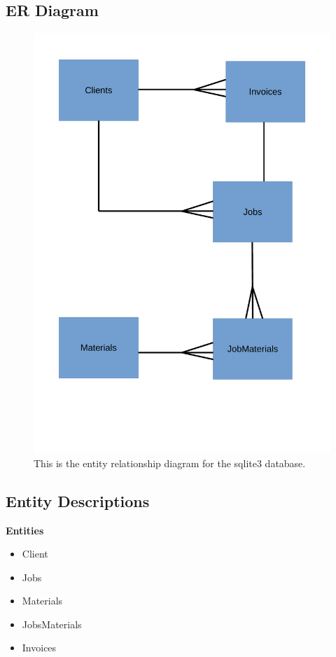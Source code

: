 \subsection{ER Diagram}

\begin{figure}[H]
    \includegraphics[width=\textwidth]{./Analysis/images/entityRelationshipDiagram.pdf}
    \caption{This is the entity relationship diagram for the sqlite3 database.} \label{fig:Entity_Relationship_Diagram}
\end{figure}


\subsection{Entity Descriptions}

\textbf{Entities}
	\begin{itemize}
		\item Client
		\item Jobs
		\item Materials
		\item JobsMaterials
		\item Invoices
	\end{itemize}

